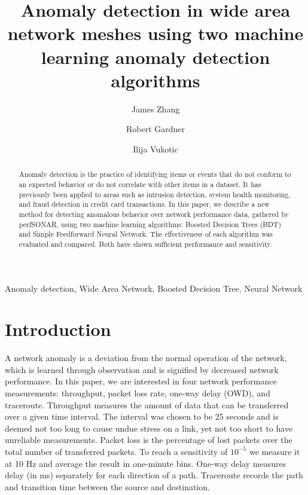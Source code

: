 \documentclass[5p]{elsarticle}
\begin{document}
\begin{frontmatter}

\title{Anomaly detection in wide area network meshes using two machine learning anomaly detection algorithms}

\author{James Zhang}
\author{Robert Gardner}
\author{Ilija Vukotic}
\address{University of Chicago, Physics Research Center, 933 East 56$^{th}$ St., Chicago, IL, 60637 USA}



\begin{abstract}
Anomaly detection is the practice of identifying items or events that do not conform to an expected behavior or do not correlate with other items in a dataset. It has previously been applied to areas such as intrusion detection, system health monitoring, and fraud detection in credit card transactions. In this paper, we describe a new method for detecting anomalous behavior over network performance data, gathered by perfSONAR, using two machine learning algorithms: Boosted Decision Trees (BDT) and Simple Feedforward Neural Network. The effectiveness of each algorithm was evaluated and compared. Both have shown sufficient performance and sensitivity.
\end{abstract}

\begin{keyword}
Anomaly detection, Wide Area Network, Boosted Decision Tree, Neural Network
\end{keyword}

\end{frontmatter}



\section{Introduction}

A network anomaly is a deviation from the normal operation of the network, which is learned through observation and is signified by decreased network performance. In this paper, we are interested in four network performance measurements: throughput, packet loss rate, one-way delay (OWD), and traceroute. Throughput measures the amount of data that can be transferred over a given time interval. The interval was chosen to be 25 seconds and is deemed not too long to cause undue stress on a link, yet not too short to have unreliable measurements. Packet loss is the percentage of lost packets over the total number of transferred packets. To reach a sensitivity of $10^{-5}$ we measure it at 10 Hz and average the result in one-minute bins. One-way delay measures delay (in ms) separately for each direction of a path. Traceroute records the path and transition time between the source and destination.
\end{document}

